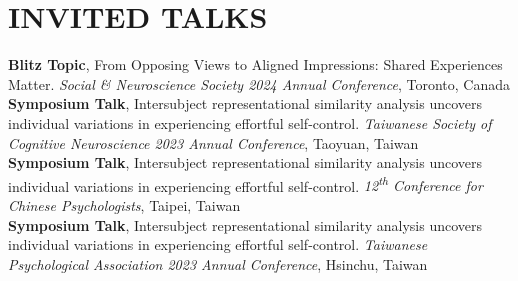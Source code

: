\documentclass[a4paper,12pt]{article}
\newcommand{\sectionspace}{0pt} %
\newcommand{\itemspace}{7pt} %
\begin{document}
\section*{INVITED TALKS}
\textbf{Blitz Topic},  From Opposing Views to Aligned Impressions: Shared Experiences Matter.  \textit{Social \& Neuroscience Society 2024 Annual Conference}, Toronto, Canada \\[\itemspace]
\textbf{Symposium Talk}, Intersubject representational similarity analysis uncovers individual variations in experiencing effortful self-control. \textit{Taiwanese Society of Cognitive Neuroscience 2023 Annual Conference}, Taoyuan, Taiwan \\[\itemspace]
\textbf{Symposium Talk}, Intersubject representational similarity analysis uncovers individual variations in experiencing effortful self-control.  \textit{12\textsuperscript{th} Conference for Chinese Psychologists}, Taipei, Taiwan \\[\itemspace]
\textbf{Symposium Talk}, Intersubject representational similarity analysis uncovers individual variations in experiencing effortful self-control.  \textit{Taiwanese Psychological Association 2023 Annual Conference}, Hsinchu, Taiwan \\[\itemspace]

\vspace{\sectionspace}
\end{document}
